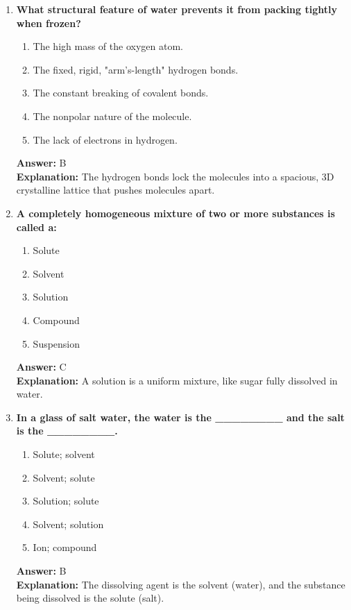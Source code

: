 \documentclass[11pt, a4paper]{article}
\begin{document}
\begin{enumerate}
\item \textbf{What structural feature of water prevents it from packing tightly when frozen?}
\begin{enumerate}[label=\Alph*.]
    \item The high mass of the oxygen atom.
    \item The fixed, rigid, "arm's-length" hydrogen bonds.
    \item The constant breaking of covalent bonds.
    \item The nonpolar nature of the molecule.
    \item The lack of electrons in hydrogen.
\end{enumerate}
\textbf{Answer:} B \\
\textbf{Explanation:} The hydrogen bonds lock the molecules into a spacious, 3D crystalline lattice that pushes molecules apart.


\item \textbf{A completely homogeneous mixture of two or more substances is called a:}
\begin{enumerate}[label=\Alph*.]
    \item Solute
    \item Solvent
    \item Solution
    \item Compound
    \item Suspension
\end{enumerate}
\textbf{Answer:} C \\
\textbf{Explanation:} A solution is a uniform mixture, like sugar fully dissolved in water.

\item \textbf{In a glass of salt water, the water is the \_\_\_\_\_\_\_\_ and the salt is the \_\_\_\_\_\_\_\_.}
\begin{enumerate}[label=\Alph*.]
    \item Solute; solvent
    \item Solvent; solute
    \item Solution; solute
    \item Solvent; solution
    \item Ion; compound
\end{enumerate}
\textbf{Answer:} B \\
\textbf{Explanation:} The dissolving agent is the solvent (water), and the substance being dissolved is the solute (salt).


\end{enumerate}
\end{document}
